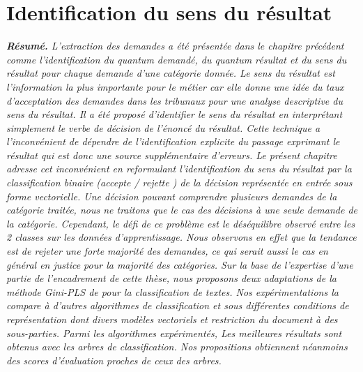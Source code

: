 \chapter{Identification du sens du résultat}
\label{chap:sensresultat}


%
%
%
%
%
%
%

\textit{\small \textbf{Résumé.} L'extraction des demandes a été présentée dans le chapitre précédent comme l'identification du quantum demandé, du quantum résultat et du sens du résultat pour chaque demande d'une catégorie donnée. Le sens du résultat est l'information la plus importante pour le métier car elle donne une idée du taux d'acceptation des demandes dans les tribunaux pour une analyse descriptive du sens du résultat. Il a été proposé d'identifier le sens du résultat en interprétant simplement le verbe de décision de l'énoncé du résultat. Cette technique a l'inconvénient de dépendre de l'identification explicite du passage exprimant le résultat qui est donc une source supplémentaire d'erreurs. Le présent chapitre adresse cet inconvénient en reformulant l'identification du sens du résultat par la classification binaire (\og accepte \fg{} / \og rejette \fg{}) de la décision représentée en entrée sous forme vectorielle. Une décision pouvant comprendre plusieurs demandes de la catégorie traitée, nous ne traitons que le cas des décisions à une seule demande de la catégorie. Cependant, le défi de ce problème est le déséquilibre observé entre les 2 classes sur les données d'apprentissage. Nous observons en effet que la tendance est de rejeter une forte majorité des demandes, ce qui serait aussi le cas en général en justice pour la majorité des catégories. Sur la base de l'expertise d'une partie de l'encadrement de cette thèse, nous proposons deux adaptations de la méthode Gini-PLS de \citet{mussard2018ginipls} pour la classification de textes. Nos expérimentations la compare à d'autres algorithmes de classification et sous différentes conditions de représentation dont divers modèles vectoriels et restriction du document à des sous-parties. Parmi les algorithmes expérimentés, Les meilleures résultats sont obtenus avec les arbres de classification. Nos propositions obtiennent néanmoins des scores d'évaluation proches de ceux des arbres.}


